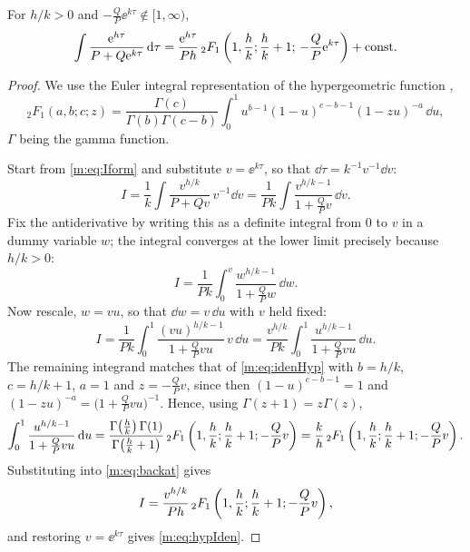 \begin{proposition}
\label{m:prop:hypIden}
For $h/k>0$ and $-\tfrac{Q}{P}\ee^{k\tau}\notin[1,\infty)$,
\begin{equation}
\label{m:eq:hypIden}
\int\frac{\mathrm{e}^{h\tau}}{P+Q\mathrm{e}^{k\tau}}\,\mathrm{d}\tau
= \frac{\mathrm{e}^{h\tau}}{Ph}\,{}_2F_1\left(1,\frac{h}{k};\frac{h}{k}+1;\,-\frac{Q}{P}\mathrm{e}^{k\tau}\right)
+ \text{const} .
\end{equation}
\end{proposition}

\begin{proof}
We use the Euler integral representation of the hypergeometric function
\cite{Olver2010},
\begin{equation}
\label{m:eq:idenHyp}
{}_2F_1(a,b;c;z)
= \frac{\Gamma(c)}{\Gamma(b)\Gamma(c-b)}\int_0^1 u^{b-1}(1-u)^{c-b-1}(1-zu)^{-a}\,\dd u ,
\end{equation}
$\Gamma$ being the gamma function.

Start from \cref{m:eq:Iform} and substitute $v = \ee^{k\tau}$, so that
$\dd\tau = k^{-1}v^{-1}\dd v$:
\begin{equation*}
I = \frac1k\int\frac{v^{h/k}}{P+Qv}\,v^{-1}\dd v
= \frac{1}{Pk}\int\frac{v^{h/k-1}}{1+\frac{Q}{P}v}\,\dd v .
\end{equation*}
Fix the antiderivative by writing this as a definite integral from $0$ to $v$ in a
dummy variable $w$; the integral converges at the lower limit precisely because
$h/k>0$:
\begin{equation*}
I = \frac{1}{Pk}\int_0^v\frac{w^{h/k-1}}{1+\frac{Q}{P}w}\,\dd w .
\end{equation*}
Now rescale, $w = vu$, so that $\dd w = v\,\dd u$ with $v$ held fixed:
\begin{equation}
\label{m:eq:backat}
I = \frac{1}{Pk}\int_0^1\frac{(vu)^{h/k-1}}{1+\frac{Q}{P}vu}\,v\,\dd u
= \frac{v^{h/k}}{Pk}\int_0^1\frac{u^{h/k-1}}{1+\frac{Q}{P}vu}\,\dd u .
\end{equation}
The remaining integrand matches that of \cref{m:eq:idenHyp} with $b = h/k$,
$c = h/k+1$, $a=1$ and $z = -\tfrac{Q}{P}v$, since then $(1-u)^{c-b-1} = 1$ and
$(1-zu)^{-a} = \bigl(1+\tfrac{Q}{P}vu\bigr)^{-1}$. Hence, using
$\Gamma(z+1) = z\Gamma(z)$,
\begin{equation*}
\int_0^1\frac{u^{h/k-1}}{1+\frac{Q}{P}vu}\,\mathrm{d} u
= \frac{\Gamma\!\left(\frac hk\right)\Gamma(1)}{\Gamma\!\left(\frac hk+1\right)}\,
{}_2F_1\left(1,\frac hk;\frac hk+1;-\frac QP v\right)
= \frac kh\,{}_2F_1\left(1,\frac hk;\frac hk+1;-\frac QP v\right).
\end{equation*}
Substituting into \cref{m:eq:backat} gives
\begin{equation*}
I = \frac{v^{h/k}}{Ph}\,{}_2F_1\left(1,\frac hk;\frac hk+1;-\frac QP v\right),
\end{equation*}
and restoring $v = \ee^{k\tau}$ gives \cref{m:eq:hypIden}.
\end{proof}

